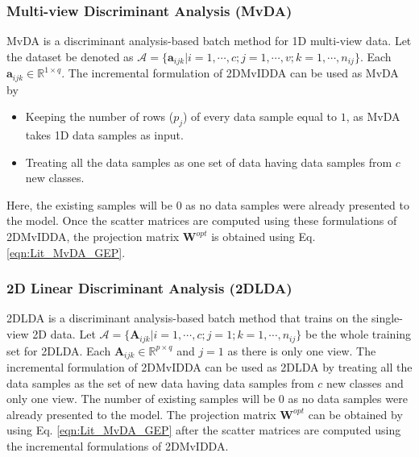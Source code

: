 \subsubsection{Multi-view Discriminant Analysis (MvDA)}
\label{ssubs:2DMvIDDA_MvDA}
MvDA is a discriminant analysis-based batch method for 1D multi-view data. Let the dataset be denoted as $\mathcal{A} = \{ \textbf{a}_{ijk} | i=1,\cdots,c; j=1,\cdots,v; k=1,\cdots,n_{ij} \}$. Each $\textbf{a}_{ijk} \in \mathbb{R}^{1 \times q}$. The incremental formulation of 2DMvIDDA can be used as MvDA by 
\begin{itemize}
	\item Keeping the number of rows ($p_j$) of every data sample equal to $1$, as MvDA takes 1D data samples as input.
	\item Treating all the data samples as one set of data having data samples from $c$ new classes.
\end{itemize}
Here, the existing samples will be $0$ as no data samples were already presented to the model. Once the scatter matrices are computed using these formulations of 2DMvIDDA, the projection matrix $\textbf{W}^{opt}$ is obtained using Eq.\ref{eqn:Lit_MvDA_GEP}.




\subsubsection{2D Linear Discriminant Analysis (2DLDA)}
\label{ssubs:2DMvIDDA_2DLDA}
2DLDA is a discriminant analysis-based batch method that trains on the single-view 2D data. Let $\mathcal{A} = \{ \textbf{A}_{ijk} | i=1,\cdots,c; j=1; k=1,\cdots,n_{ij} \}$ be the whole training set for 2DLDA. Each $\textbf{A}_{ijk} \in \mathbb{R}^{p \times q}$ and $j = 1$ as there is only one view. The incremental formulation of 2DMvIDDA can be used as 2DLDA by treating all the data samples as the set of new data having data samples from $c$ new classes and only one view. The number of existing samples will be $0$ as no data samples were already presented to the model. The projection matrix $\textbf{W}^{opt}$ can be obtained by using Eq. \ref{eqn:Lit_MvDA_GEP} after the scatter matrices are computed using the incremental formulations of 2DMvIDDA.




